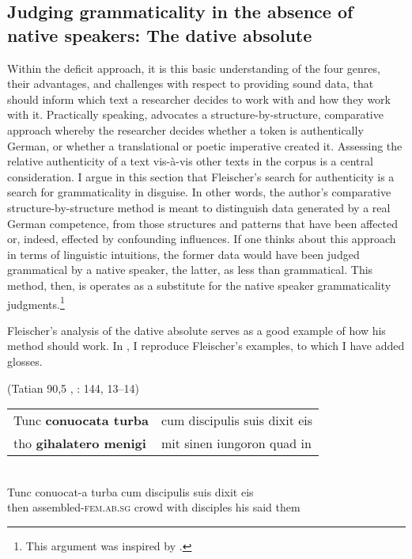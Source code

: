 \subsection{Judging grammaticality in the absence of native speakers: The dative absolute}\label{sec:2.1.2}

Within the deficit approach, it is this basic understanding of the four genres, their advantages, and challenges with respect to providing sound data, that should inform which text a researcher decides to work with and how they work with it. Practically speaking, \citet{Fleischer2006} advocates a structure-by-structure, comparative approach whereby the researcher decides whether a token is authentically German, or whether a translational or poetic imperative created it. Assessing the relative authenticity of a text vis-à-vis other texts in the corpus is a central consideration. I argue in this section that Fleischer’s search for authenticity is a search for grammaticality in disguise. In other words, the author’s comparative structure-by-structure method is meant to distinguish data generated by a real German competence, from those structures and patterns that have been affected or, indeed, effected by confounding influences. If one thinks about this approach in terms of linguistic intuitions, the former data would have been judged grammatical by a native speaker, the latter, as less than grammatical. This method, then, is operates as a substitute for the native speaker grammaticality judgments.\footnote{{This argument was inspired by \citet[370--373]{Somers2021a}.} }

Fleischer’s analysis of the dative absolute serves as a good example of how his method should work. In , I reproduce Fleischer’s examples, to which I have added glosses.

\ea%
    \label{ex:2:5}(Tatian 90,5 \citealt{Sievers1961}, \citealt{Masser1994}: 144, 13--14)\medskip\\
    \begin{tabular}{@{}ll@{}}
    Tunc \textbf{conuocata turba}  &  cum discipulis suis dixit eis\\
    tho \textbf{gihalatero menigi} &   mit sinen iungoron quad in     \\
    \end{tabular}\medskip\\

\gll Tunc  conuocat-a      turba  cum    discipulis  suis    dixit  eis\\
  then   assembled-\textsc{fem.ab.sg}  crowd  with  disciples    his    said  them\\

